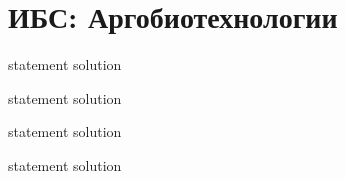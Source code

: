 \chapter{ИБС: Аргобиотехнологии}

{statement}
{solution}

{statement}
{solution}

{statement}
{solution}

{statement}
{solution}